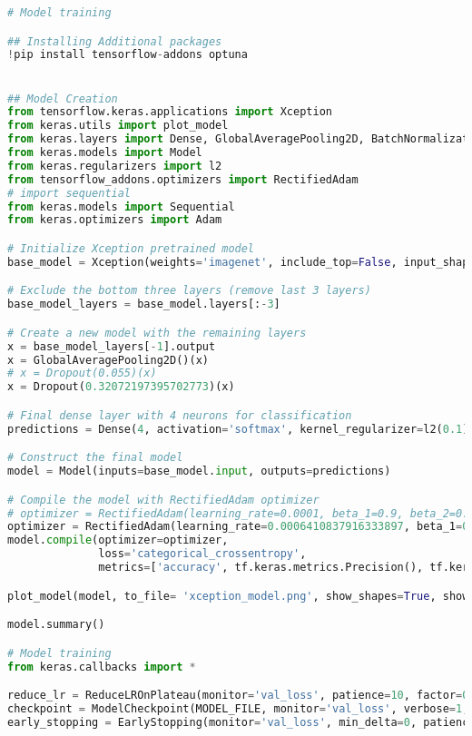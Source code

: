 \begin{lstlisting}[language=Python]
# Model training

## Installing Additional packages
!pip install tensorflow-addons optuna


## Model Creation
from tensorflow.keras.applications import Xception
from keras.utils import plot_model
from keras.layers import Dense, GlobalAveragePooling2D, BatchNormalization, Dropout
from keras.models import Model
from keras.regularizers import l2
from tensorflow_addons.optimizers import RectifiedAdam
# import sequential
from keras.models import Sequential
from keras.optimizers import Adam

# Initialize Xception pretrained model
base_model = Xception(weights='imagenet', include_top=False, input_shape=(224,224,3))

# Exclude the bottom three layers (remove last 3 layers)
base_model_layers = base_model.layers[:-3]

# Create a new model with the remaining layers
x = base_model_layers[-1].output
x = GlobalAveragePooling2D()(x)
# x = Dropout(0.055)(x)
x = Dropout(0.32072197395702773)(x)

# Final dense layer with 4 neurons for classification
predictions = Dense(4, activation='softmax', kernel_regularizer=l2(0.1), dtype='float64')(x)

# Construct the final model
model = Model(inputs=base_model.input, outputs=predictions)

# Compile the model with RectifiedAdam optimizer
# optimizer = RectifiedAdam(learning_rate=0.0001, beta_1=0.9, beta_2=0.999, epsilon=1e-08)
optimizer = RectifiedAdam(learning_rate=0.0006410837916333897, beta_1=0.9, beta_2=0.999, epsilon=1e-08)
model.compile(optimizer=optimizer,
              loss='categorical_crossentropy',
              metrics=['accuracy', tf.keras.metrics.Precision(), tf.keras.metrics.Recall(), 'categorical_accuracy'])

plot_model(model, to_file= 'xception_model.png', show_shapes=True, show_layer_names=True)

model.summary()

# Model training
from keras.callbacks import *

reduce_lr = ReduceLROnPlateau(monitor='val_loss', patience=10, factor=0.3, min_lr=1e-6)
checkpoint = ModelCheckpoint(MODEL_FILE, monitor='val_loss', verbose=1, save_best_only=True)
early_stopping = EarlyStopping(monitor='val_loss', min_delta=0, patience=20, verbose=1, mode='auto')


\end{lstlisting}

